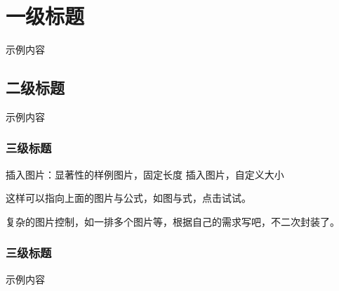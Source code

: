 \chapter{一级标题}
示例内容

\section{二级标题}
示例内容
\subsection{三级标题}

插入图片：显著性的样例图片，固定长度
插入图片，自定义大小


这样可以指向上面的图片与公式，如图与式，点击试试。



复杂的图片控制，如一排多个图片等，根据自己的需求写吧，不二次封装了。


\subsection{三级标题}
示例内容

